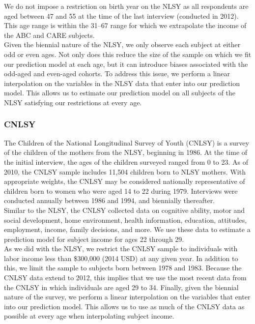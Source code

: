 \noindent We do not impose a restriction on birth year on the NLSY as all respondents are aged between 47 and 55
at the time of the last interview (conducted in 2012). This age range is within the 31--67 range for which
we extrapolate the income of the ABC and CARE subjects. \\

\noindent Given the biennial nature of the NLSY, we only observe each subject at either odd or even
ages. Not only does this reduce the size of the sample on which we fit our prediction model
at each age, but it can introduce biases associated with the odd-aged and even-aged cohorts.
To address this issue, we perform a linear interpolation on the variables in the NLSY data
that enter into our prediction model. This allows us to estimate our prediction model on
all subjects of the NLSY satisfying our restrictions at every age. \\

\subsubsection{CNLSY}
\label{app:subject_income_cnlsy}

\noindent The Children of the National Longitudinal Survey of Youth (CNLSY) is a survey of the children of the mothers from the NLSY, beginning in 1986. At the time of
the initial interview, the ages of the children surveyed ranged from 0 to 23. As of 2010,
the CNLSY sample includes 11,504 children born to NLSY mothers. With appropriate weights,
the CNLSY may be considered nationally representative of children born to women
who were aged 14 to 22 during 1979. Interviews were conducted annually between 1986 and 1994,
and biennially thereafter. \\

\noindent Similar to the NLSY, the CNLSY collected data on cognitive ability, motor and social development,
home environment, health information, education, attitudes, employment, income, family decisions,
and more. We use these data to estimate a prediction model for subject income for ages
22 through 29. \\

\noindent As we did with the NLSY, we restrict the CNLSY sample to individuals with labor income less than
\$300,000 (2014 USD) at any given year. In addition to this, we limit the sample to subjects born
between 1978 and 1983. Because the CNLSY data extend to 2012, this implies that we use the most
recent data from the CNLSY in which individuals are aged 29 to 34. Finally, given the biennial
nature of the survey, we perform a linear interpolation on the variables that enter into our prediction
model. This allows us to use as much of the CNLSY data as possible at every age when
interpolating subject income. \\

